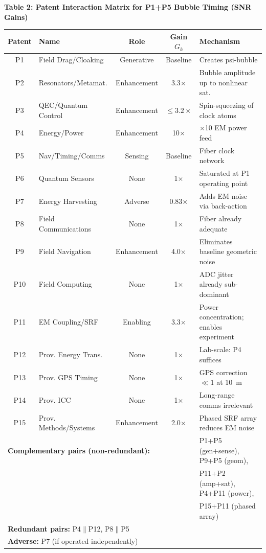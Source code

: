 \begin{center}
\textbf{Table 2: Patent Interaction Matrix for P1+P5 Bubble Timing (SNR Gains)}
\vspace{0.5em}

\begin{longtable}{@{}clccp{4cm}@{}}
\toprule
\textbf{Patent} & \textbf{Name} & \textbf{Role} & \textbf{Gain $G_k$}
& \textbf{Mechanism} \\
\midrule
\endhead
\rowcolor{rowhi}
P1  & Field Drag/Cloaking   & Generative  & Baseline & Creates psi-bubble \\
P2  & Resonators/Metamat.   & Enhancement & 3.3$\times$ & Bubble amplitude up to nonlinear sat. \\
P3  & QEC/Quantum Control   & Enhancement & $\leq 3.2\times$ & Spin-squeezing of clock atoms \\
\rowcolor{rowhi}
P4  & Energy/Power          & Enhancement & 10$\times$ & $\times$10 EM power feed \\
\rowcolor{rowhi}
P5  & Nav/Timing/Comms      & Sensing     & Baseline & Fiber clock network \\
P6  & Quantum Sensors       & None        & 1$\times$ & Saturated at P1 operating point \\
P7  & Energy Harvesting     & Adverse     & 0.83$\times$ & Adds EM noise via back-action \\
P8  & Field Communications  & None        & 1$\times$ & Fiber already adequate \\
\rowcolor{rowhi}
P9  & Field Navigation      & Enhancement & 4.0$\times$ & Eliminates baseline geometric noise \\
P10 & Field Computing       & None        & 1$\times$ & ADC jitter already sub-dominant \\
\rowcolor{rowhi}
P11 & EM Coupling/SRF       & Enabling    & 3.3$\times$ & Power concentration; enables experiment \\
P12 & Prov. Energy Trans.   & None        & 1$\times$ & Lab-scale: P4 suffices \\
P13 & Prov. GPS Timing      & None        & 1$\times$ & GPS correction $\ll 1$ at 10~m \\
P14 & Prov. ICC             & None        & 1$\times$ & Long-range comms irrelevant \\
\rowcolor{rowhi}
P15 & Prov. Methods/Systems & Enhancement & 2.0$\times$ & Phased SRF array reduces EM noise \\
\midrule
\multicolumn{4}{l}{\textbf{Complementary pairs (non-redundant):}}
& P1+P5 (gen+sense), P9+P5 (geom), \\
\multicolumn{4}{l}{}
& P11+P2 (amp+sat), P4+P11 (power),\\
\multicolumn{4}{l}{}
& P15+P11 (phased array) \\
\multicolumn{4}{l}{\textbf{Redundant pairs:} P4$\parallel$P12, P8$\parallel$P5}
& \\
\multicolumn{4}{l}{\textbf{Adverse:} P7 (if operated independently)}
& \\
\bottomrule
\end{longtable}
\end{center}

